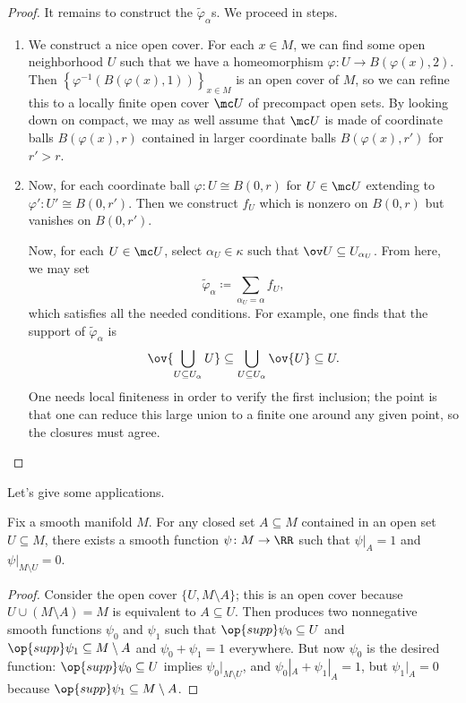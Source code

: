 \documentclass[../notes.tex]{subfiles}
\begin{document}
\begin{proof}
	It remains to construct the $\widetilde\varphi_\alpha$s. We proceed in steps.
	\begin{enumerate}
		\item We construct a nice open cover. For each $x\in M$, we can find some open neighborhood $U$ such that we have a homeomorphism $\varphi\colon U\to B(\varphi(x),2)$. Then $\left\{\varphi^{-1}(B(\varphi(x),1))\right\}_{x\in M}$ is an open cover of $M$, so we can refine this to a locally finite open cover $\mc U$ of precompact open sets. By looking down on compact, we may as well assume that $\mc U$ is made of coordinate balls $B(\varphi(x),r)$ contained in larger coordinate balls $B(\varphi(x),r')$ for $r'>r$.
		\item Now, for each coordinate ball $\varphi\colon U\cong B(0,r)$ for $U\in\mc U$ extending to $\varphi'\colon U'\cong B(0,r')$. Then we construct $f_U$ which is nonzero on $B(0,r)$ but vanishes on $B(0,r')$.

		Now, for each $U\in\mc U$, select $\alpha_U\in\kappa$ such that $\ov U\subseteq U_{\alpha_U}$. From here, we may set
		\[\widetilde\varphi_\alpha\coloneqq\sum_{\alpha_U=\alpha}f_U,\]
		which satisfies all the needed conditions. For example, one finds that the support of $\widetilde\varphi_\alpha$ is
		\[\ov{\bigcup_{U\subseteq U_\alpha}U}\subseteq\bigcup_{U\subseteq U_\alpha}\ov{U}\subseteq U.\]
		One needs local finiteness in order to verify the first inclusion; the point is that one can reduce this large union to a finite one around any given point, so the closures must agree.
		\qedhere
	\end{enumerate}
\end{proof}
Let's give some applications.
\begin{corollary}
	Fix a smooth manifold $M$. For any closed set $A\subseteq M$ contained in an open set $U\subseteq M$, there exists a smooth function $\psi\colon M\to\RR$ such that $\psi|_A=1$ and $\psi|_{M\setminus U}=0$.
\end{corollary}
\begin{proof}
	Consider the open cover $\{U,M\setminus A\}$; this is an open cover because $U\cup(M\setminus A)=M$ is equivalent to $A\subseteq U$. Then  produces two nonnegative smooth functions $\psi_0$ and $\psi_1$ such that $\op{supp}\psi_0\subseteq U$ and $\op{supp}\psi_1\subseteq M\setminus A$ and $\psi_0+\psi_1=1$ everywhere. But now $\psi_0$ is the desired function: $\op{supp}\psi_0\subseteq U$ implies $\psi_0|_{M\setminus U}$, and $\psi_0|_A+\psi_1|_A=1$, but $\psi_1|_A=0$ because $\op{supp}\psi_1\subseteq M\setminus A$.
\end{proof}
\end{document}
